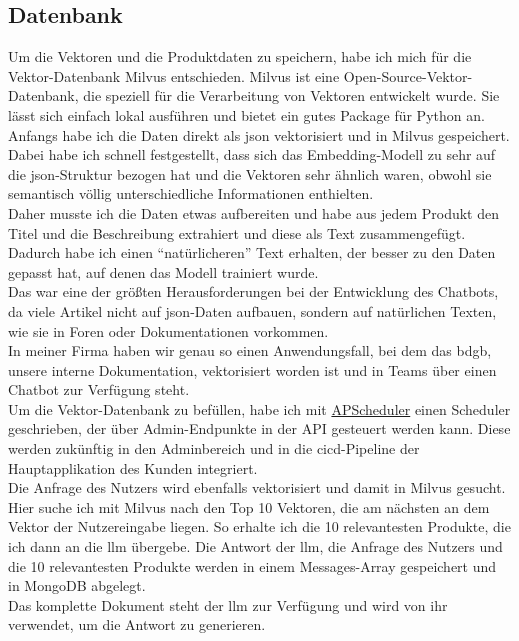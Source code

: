 \subsection{Datenbank}\label{sec:umsetzung_db}
Um die Vektoren und die Produktdaten zu speichern, habe ich mich für die Vektor-Datenbank Milvus \cite{milvus} entschieden.  
Milvus ist eine Open-Source-Vektor-Datenbank, die speziell für die Verarbeitung von Vektoren entwickelt wurde.  
Sie lässt sich einfach lokal ausführen und bietet ein gutes Package für Python an.\\  
Anfangs habe ich die Daten direkt als \gls{json} vektorisiert und in Milvus gespeichert. Dabei habe ich schnell festgestellt, dass sich das Embedding-Modell  
zu sehr auf die \gls{json}-Struktur bezogen hat und die Vektoren sehr ähnlich waren, obwohl sie semantisch völlig unterschiedliche Informationen enthielten.\\  
Daher musste ich die Daten etwas aufbereiten und habe aus jedem Produkt den Titel und die Beschreibung extrahiert und diese als Text zusammengefügt.  
Dadurch habe ich einen \enquote{natürlicheren} Text erhalten, der besser zu den Daten gepasst hat, auf denen das Modell trainiert wurde.\\  
Das war eine der größten Herausforderungen bei der Entwicklung des Chatbots, da viele Artikel nicht auf \gls{json}-Daten aufbauen, sondern auf natürlichen Texten, wie sie  
in Foren oder Dokumentationen vorkommen.\\  
In meiner Firma haben wir genau so einen Anwendungsfall, bei dem das \gls{bdgb}, unsere interne Dokumentation, vektorisiert worden ist und in Teams über einen Chatbot zur Verfügung steht.\\  
Um die Vektor-Datenbank zu befüllen, habe ich mit \href{https://apscheduler.readthedocs.io/en/3.x/}{APScheduler} einen Scheduler geschrieben, der über Admin-Endpunkte in der API gesteuert werden kann.  
Diese werden zukünftig in den Adminbereich und in die \gls{cicd}-Pipeline der Hauptapplikation des Kunden integriert.\\  
Die Anfrage des Nutzers wird ebenfalls vektorisiert und damit in Milvus gesucht. Hier suche ich mit Milvus nach den Top 10 Vektoren, die am nächsten an dem Vektor der Nutzereingabe liegen.  
So erhalte ich die 10 relevantesten Produkte, die ich dann an die \gls{llm} übergebe. Die Antwort der \gls{llm}, die Anfrage des Nutzers und die 10 relevantesten Produkte werden in einem Messages-Array  
gespeichert und in MongoDB abgelegt.\\  
Das komplette Dokument steht der \gls{llm} zur Verfügung und wird von ihr verwendet, um die Antwort zu generieren.\\  
